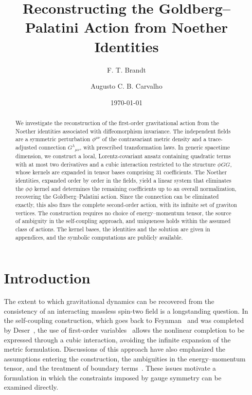 \documentclass[prd,aps,preprint,nofootinbib,amsmath,amssymb,eqsecnum]{revtex4-2}
\begin{document}
\title{Reconstructing the Goldberg--Palatini Action from Noether Identities}

\author{F. T. Brandt}
\author{Augusto C. B. Carvalho}

\date{\today}

\begin{abstract}
We investigate the reconstruction of the first-order gravitational action from the Noether
identities associated with diffeomorphism invariance. The independent fields are a symmetric
perturbation $\phi^{\mu\nu}$ of the contravariant metric density and a trace-adjusted
connection $G^{\lambda}{}_{\mu\nu}$, with prescribed transformation laws. In generic spacetime dimension, we construct a local,
Lorentz-covariant ansatz containing quadratic terms with at most two derivatives and a cubic
interaction restricted to the structure $\phi GG$, whose kernels are expanded in tensor bases
comprising 31 coefficients. The Noether identities, expanded order by order in the fields,
yield a linear system that eliminates the $\phi\phi$ kernel and determines the remaining
coefficients up to an overall normalization, recovering the Goldberg--Palatini action. Since
the connection can be eliminated exactly, this also fixes the complete second-order action,
with its infinite set of graviton vertices. The construction requires no choice of
energy--momentum tensor, the source of ambiguity in the self-coupling approach, and uniqueness
holds within the assumed class of actions. The kernel bases,
the identities and the solution are given in appendices, and the symbolic computations are
publicly available.
\end{abstract}

\maketitle


\section{Introduction}
\label{sec:introduction}

The extent to which gravitational dynamics can be recovered from the consistency of an
interacting massless spin-two field is a longstanding question. In the self-coupling
construction, which goes back to Feynman~\cite{Feynman1995} and was completed by
Deser~\cite{Deser1970}, the use of first-order variables~\cite{Palatini1919,Ferraris1982} allows the nonlinear completion to
be expressed through a cubic interaction, avoiding the infinite expansion of the metric
formulation. Discussions of this approach have also emphasized the
assumptions entering the construction, the ambiguities in the energy--momentum tensor, and the
treatment of boundary terms~\cite{Padmanabhan2008,Deser2010}. These issues motivate a
formulation in which the constraints imposed by gauge symmetry can be examined directly.
\end{document}
